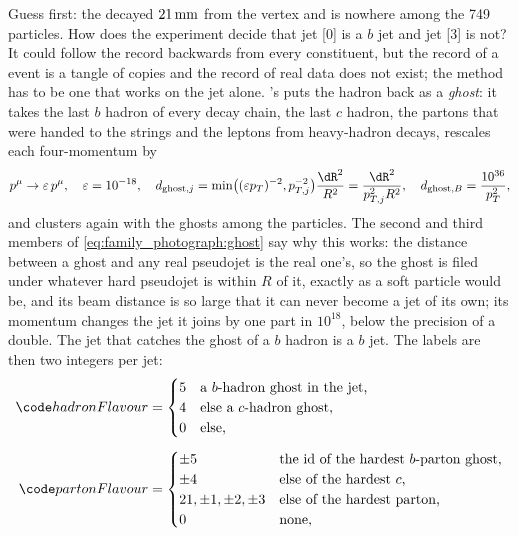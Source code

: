 Guess first: the \Bbar decayed $21\,\mathrm{mm}$ from the vertex and is nowhere
among the 749 particles. How does the experiment decide that jet [0] is a
$b$ jet and jet [3] is not? It could follow the record backwards from
every constituent, but the record of a \PYTHIA event is a tangle of
copies and the record of real data does not exist; the method has to be
one that works on the jet alone. \CMSSW's 
puts the hadron back as a \emph{ghost}: it takes the last $b$ hadron of
every decay chain, the last $c$ hadron, the partons that were handed to
the strings and the leptons from heavy-hadron decays, rescales each
four-momentum by
\begin{equation}
  p^\mu\to\varepsilon\,p^\mu,\quad\varepsilon=10^{-18},\quad
  d_{\mathrm{ghost},j}=\min\!\big((\varepsilon p_T)^{-2},p_{T,j}^{-2}\big)\frac{\dR^2}{R^2}=\frac{\dR^2}{p_{T,j}^{2}R^2},\quad
  d_{\mathrm{ghost},B}=\frac{10^{36}}{p_T^2},
  \label{eq:family_photograph:ghost}
\end{equation}
and clusters again with the ghosts among the particles. The second and
third members of \cref{eq:family_photograph:ghost} say why this works: the
distance between a ghost and any real pseudojet is the real one's, so the
ghost is filed under whatever hard pseudojet is within $R$ of it, exactly
as a soft particle would be, and its beam distance is so large that it
can never become a jet of its own; its momentum changes the jet it joins
by one part in $10^{18}$, below the precision of a double. The jet that
catches the ghost of a $b$ hadron is a $b$ jet. The labels are then two
integers per jet:
\begin{equation}
\begin{aligned}
  \hadflav&=\begin{cases}5 & \text{a $b$-hadron ghost in the jet,}\\ 4 & \text{else a $c$-hadron ghost,}\\ 0 & \text{else,}\end{cases}\\[4pt]
  \partflav&=\begin{cases}\pm5 & \text{the id of the hardest $b$-parton ghost,}\\ \pm4 & \text{else of the hardest $c$,}\\ 21,\pm1,\pm2,\pm3 & \text{else of the hardest parton,}\\ 0 & \text{none,}\end{cases}
\end{aligned}
  \label{eq:family_photograph:labels}
\end{equation}
